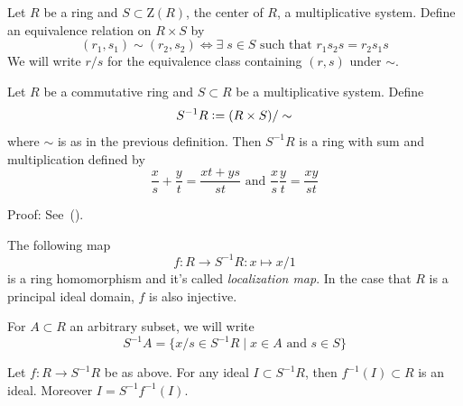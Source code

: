 \begin{dang}
    \begin{definition}
        Let $R$ be a ring and $S\subset \text{Z}(R)$, the center of $R$, a multiplicative system. Define an equivalence relation on $R\times S$ by
        \begin{equation}
            (r_1,s_1)\sim   (r_2,s_2) \iff \exists\; s\in S\text{ such that } r_1s_2s=r_2s_1s
        \end{equation}
        We will write $r/s$ for the equivalence class containing $(r,s)$ under $\sim$.
    \end{definition}
\end{dang}

\begin{dang}
    \begin{theorem}\label{localization_produces_a_ring}\cite{rowen2008graduate}
    Let $R$ be a commutative ring and $S\subset R$ be a multiplicative system. Define 
    \[
    S^{-1}R\bydef (R\times S)/\sim
    \]
    where $\sim$ is as in the previous definition. Then $S^{-1}R$ is a ring with sum and multiplication defined by
    \begin{equation}
        \frac{x}{s}+\frac{y}{t}=\frac{xt+ys}{st}\text{ and }\frac{x}{s}\frac{y}{t}=\frac{xy}{st}
    \end{equation}
    \end{theorem}
\end{dang}
Proof: See~(\cite{rowen2008graduate}).
\begin{dang}
    \begin{lemma}
        The following map
        \begin{equation}
            f:R\rightarrow S^{-1}R:x\mapsto x/1
        \end{equation}
        is a ring homomorphism and it's called \textit{localization map}. In the case that $R$ is a principal ideal domain, $f$ is also injective.
    \end{lemma}
\end{dang}
\begin{dang}
    \begin{notation}
        For $A\subset R$ an arbitrary subset, we will write
        \begin{equation}
            S^{-1}A = \big\{x/s\in S^{-1}R\;\big|\;x\in A\text{ and }s\in S\big\}
        \end{equation}
    \end{notation}
\end{dang}
\begin{dang}
    \begin{lemma}\label{localization_of_preimages_of_ideals}
    Let $f: R\rightarrow S^{-1}R$ be as above. For any ideal $I\subset S^{-1}R$, then $f^{-1}(I)\subset R$ is an ideal. Moreover $I=S^{-1}f^{-1}(I)$.
    \end{lemma}
\end{dang}

